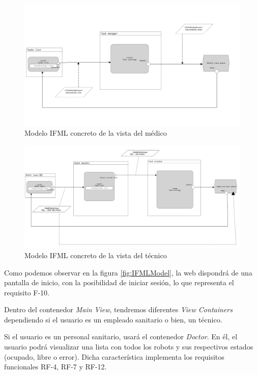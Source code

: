\begin{figure}[H]
	\centering
	\includegraphics[width=1\textwidth]{images/Doctor-IFML.png}
	\caption{Modelo IFML concreto de la vista del médico}
	\label{fig:IFMLDoctor}
\end{figure}

\begin{figure}[H]
	\centering
	\includegraphics[width=1\textwidth]{images/Tech-IFML.PNG}
	\caption{Modelo IFML concreto de la vista del técnico}
	\label{fig:IFMLTech}
\end{figure}

Como podemos observar en la figura \ref{fig:IFMLModel}, la web dispondrá de una pantalla de inicio, con la posibilidad de iniciar sesión, lo que representa el requisito F-10.

Dentro del contenedor \textit{Main View}, tendremos diferentes \textit{View Containers} dependiendo si el usuario es un empleado sanitario o bien, un técnico.

Si el usuario es un personal sanitario, usará el contenedor \textit{Doctor}. En él, el usuario podrá visualizar una lista con todos los robots y sus respectivos estados (ocupado, libre o error). Dicha característica implementa los requisitos funcionales RF-4, RF-7 y RF-12. 

